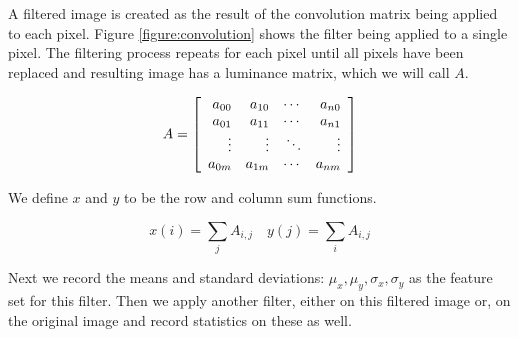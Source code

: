 A filtered image is created as the result of the convolution matrix being
applied to each pixel. Figure \ref{figure:convolution} shows the filter being
applied to a single pixel. The filtering process repeats for each pixel until
all pixels have been replaced and resulting image has a luminance matrix,
which we will call $A$.

\[A = \left [
    \begin{array}{r r r r}
        a_{00} & a_{10} & \cdots & a_{n0} \\
        a_{01} & a_{11} & \cdots & a_{n1}\\
        \vdots  & \vdots  & \ddots & \vdots\\
        a_{0m} & a_{1m} & \cdots & a_{nm}\\
    \end{array}
\right ] \]

We define $x$ and $y$ to be the row and column sum functions.

\begin{equation}
x(i) = \sum_{j}{A_{i,j}} \quad
y(j) = \sum_{i}{A_{i,j}}
\end{equation}

Next we record the means and standard deviations: $\mu_x, \mu_y, \sigma_x,
\sigma_y$ as the feature set for this filter. Then we apply another
filter, either on this filtered image or, on the original image and record
statistics on these as well.

